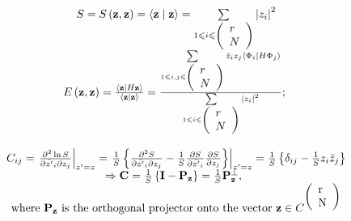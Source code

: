 \documentclass{amsart}
\begin{document}
\[
\begin{array}{c}
 S=S\left( {{\rm {\bf z}},{\rm {\bf z}}} \right)=\left\langle {{\rm {\bf
z}}} \mathrel{\left| {\vphantom {{\rm {\bf z}} {\rm {\bf z}}}} \right.
\kern-\nulldelimiterspace} {{\rm {\bf z}}} \right\rangle
=\sum\limits_{1\leqslant i\leqslant \left( {{\begin{array}{*{20}c}
 r \hfill \\
 N \hfill \\
\end{array} }} \right)} {\left| {z_i } \right|} ^2 \\
 E\left( {{\rm {\bf z}},{\rm {\bf z}}} \right)=\frac{\left\langle {{\rm {\bf
z}}} \mathrel{\left| {\vphantom {{\rm {\bf z}} {H{\rm {\bf z}}}}} \right.
\kern-\nulldelimiterspace} {H{\rm {\bf z}}} \right\rangle }{\left\langle
{{\rm {\bf z}}} \mathrel{\left| {\vphantom {{\rm {\bf z}} {\rm {\bf z}}}}
\right. \kern-\nulldelimiterspace} {{\rm {\bf z}}} \right\rangle
}=\frac{\sum\limits_{1\leqslant i,j\leqslant \left( {{\begin{array}{*{20}c}
 r \hfill \\
 N \hfill \\
\end{array} }} \right)} {\bar {z}_i z_j \left\langle {\Phi _i }
\mathrel{\left| {\vphantom {{\Phi _i } {H\Phi _j }}} \right.
\kern-\nulldelimiterspace} {H\Phi _j } \right\rangle }
}{\sum\limits_{1\leqslant i\leqslant \left( {{\begin{array}{*{20}c}
 r \hfill \\
 N \hfill \\
\end{array} }} \right)} {\left| {z_i } \right|^2} }\mbox{; } \\
 \\
 C_{ij} =\left. {\frac{\partial ^2\ln S}{\partial \bar {{z}'}_i \partial z_j
}} \right|_{{z}'=z} =\left. {\frac{1}{S}\left\{ {\frac{\partial
^2S}{\partial \bar {{z}'}_i \partial z_j }-\frac{1}{S}\frac{\partial
S}{\partial \bar {{z}'}_i }\frac{\partial S}{\partial z_j }} \right\}}
\right|_{{z}'=z} =\frac{1}{S}\left\{ {\delta _{ij} -\frac{1}{S}z_i \bar
{z}_j } \right\} \\
 \Rightarrow {\rm {\bf C}}=\frac{1}{S}\left\{ {{\rm {\bf I}}-{\rm {\bf
P}}_{\rm {\bf z}} } \right\}=\frac{1}{S}{\rm {\bf P}}_{\rm {\bf z}}^\bot
,\mbox{ } \\
 \mbox{where }{\rm {\bf P}}_{\rm {\bf z}} \mbox{ is the orthogonal projector
onto the vector }{\rm {\bf z}}\in C^{\left( {{\begin{array}{*{20}c}
 \mbox{r} \hfill \\
 \mbox{N} \hfill \\
\end{array} }} \right)} \\
 \end{array}
\]
\end{document}
